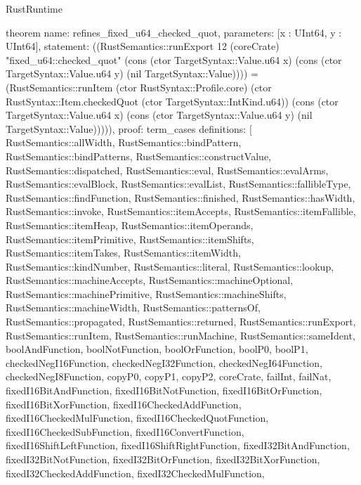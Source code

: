 \begin{lexlean}{RustRuntime}
\begin{semanticmodule}
theorem{
  name: refines_fixed_u64_checked_quot,
  parameters: [x : UInt64, y : UInt64],
  statement: ((RustSemantics::runExport 12 (coreCrate) "fixed_u64::checked_quot" (cons (ctor TargetSyntax::Value.u64 x) (cons (ctor TargetSyntax::Value.u64 y) (nil TargetSyntax::Value)))) = (RustSemantics::runItem (ctor RustSyntax::Profile.core) (ctor RustSyntax::Item.checkedQuot (ctor TargetSyntax::IntKind.u64)) (cons (ctor TargetSyntax::Value.u64 x) (cons (ctor TargetSyntax::Value.u64 y) (nil TargetSyntax::Value))))),
  proof: term_cases{
    definitions: [
      RustSemantics::allWidth,
      RustSemantics::bindPattern,
      RustSemantics::bindPatterns,
      RustSemantics::constructValue,
      RustSemantics::dispatched,
      RustSemantics::eval,
      RustSemantics::evalArms,
      RustSemantics::evalBlock,
      RustSemantics::evalList,
      RustSemantics::fallibleType,
      RustSemantics::findFunction,
      RustSemantics::finished,
      RustSemantics::hasWidth,
      RustSemantics::invoke,
      RustSemantics::itemAccepts,
      RustSemantics::itemFallible,
      RustSemantics::itemHeap,
      RustSemantics::itemOperands,
      RustSemantics::itemPrimitive,
      RustSemantics::itemShifts,
      RustSemantics::itemTakes,
      RustSemantics::itemWidth,
      RustSemantics::kindNumber,
      RustSemantics::literal,
      RustSemantics::lookup,
      RustSemantics::machineAccepts,
      RustSemantics::machineOptional,
      RustSemantics::machinePrimitive,
      RustSemantics::machineShifts,
      RustSemantics::machineWidth,
      RustSemantics::patternsOf,
      RustSemantics::propagated,
      RustSemantics::returned,
      RustSemantics::runExport,
      RustSemantics::runItem,
      RustSemantics::runMachine,
      RustSemantics::sameIdent,
      boolAndFunction,
      boolNotFunction,
      boolOrFunction,
      boolP0,
      boolP1,
      checkedNegI16Function,
      checkedNegI32Function,
      checkedNegI64Function,
      checkedNegI8Function,
      copyP0,
      copyP1,
      copyP2,
      coreCrate,
      failInt,
      failNat,
      fixedI16BitAndFunction,
      fixedI16BitNotFunction,
      fixedI16BitOrFunction,
      fixedI16BitXorFunction,
      fixedI16CheckedAddFunction,
      fixedI16CheckedMulFunction,
      fixedI16CheckedQuotFunction,
      fixedI16CheckedSubFunction,
      fixedI16ConvertFunction,
      fixedI16ShiftLeftFunction,
      fixedI16ShiftRightFunction,
      fixedI32BitAndFunction,
      fixedI32BitNotFunction,
      fixedI32BitOrFunction,
      fixedI32BitXorFunction,
      fixedI32CheckedAddFunction,
      fixedI32CheckedMulFunction,
}}
\end{semanticmodule}
\end{lexlean}
